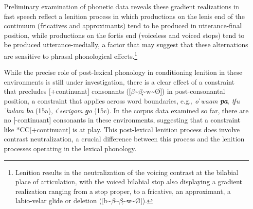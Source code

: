 







Preliminary examination of phonetic data reveals these gradient realizations in fast speech reflect a lenition process in which productions on the lenis end of the continuum (fricatives and approximants) tend to be produced in utterance-final position, while productions on the fortis end (voiceless and voiced stops) tend to be produced utterance-medially, a factor that may suggest that these alternations are sensitive to phrasal phonological effects.\footnote{Lenition results in the neutralization of the voicing contrast at the bilabial place of articulation, with the voiced bilabial stop also displaying a gradient realization ranging from a stop proper, to a fricative, an approximant, a labio-velar glide or deletion ([b{\textasciitilde}$\beta ${\textasciitilde}$\beta ̞${\textasciitilde}w{\textasciitilde}Ø]).}{}

While the precise role of post-lexical phonology in conditioning lenition in these environments is still under investigation, there is a clear effect of a constraint that precludes [+continuant] consonants ([$\beta ${\textasciitilde}$\beta ̞${\textasciitilde}w{\textasciitilde}Ø]) in post-consonantal position, a constraint that applies across word boundaries, e.g., \textit{oˈwaam} \textbf{\textit{pa}}, \textit{tʃuˈkulam} \textbf{\textit{b}}\textit{a} (15a), \textit{iˈserigam} \textbf{\textit{g}}\textit{o} (15c). In the corpus data examined so far, there are no [-continuant] consonants in these environments, suggesting that a constraint like *CC[+continuant] is at play. This post-lexical lenition process does involve contrast neutralization, a crucial difference between this process and the lenition processes operating in the lexical phonology.

